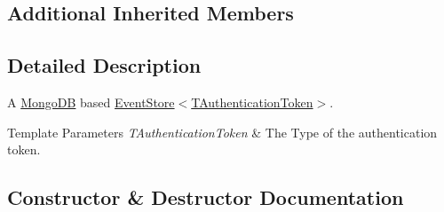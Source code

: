 \subsection*{Additional Inherited Members}


\subsection{Detailed Description}
A \hyperlink{namespaceCqrs_1_1MongoDB}{Mongo\+DB} based \hyperlink{classCqrs_1_1Events_1_1EventStore_a6346cb2aea4c5b4e740dc6cfb15abab8_a6346cb2aea4c5b4e740dc6cfb15abab8}{Event\+Store$<$\+T\+Authentication\+Token$>$}. 


\begin{DoxyTemplParams}{Template Parameters}
{\em T\+Authentication\+Token} & The Type of the authentication token.\\
\hline
\end{DoxyTemplParams}


\subsection{Constructor \& Destructor Documentation}
\mbox{\label{classCqrs_1_1MongoDB_1_1Events_1_1MongoDbEventStore_a37e57e6f1e4e545630c1c98a5aab46a3_a37e57e6f1e4e545630c1c98a5aab46a3}} 
